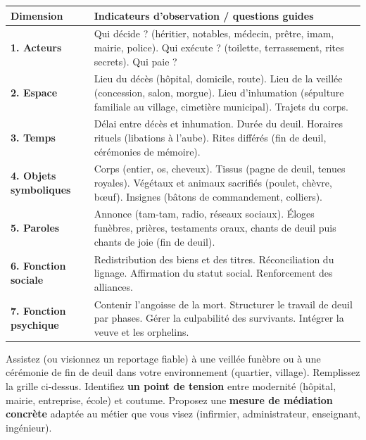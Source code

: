 \documentclass[11pt]{article}
\begin{document}
\begin{center}
\begin{tabularx}{\linewidth}{|l|X|}\hline
\rowcolor{popblueL}\textbf{Dimension} & \textbf{Indicateurs d'observation / questions guides} \\ \hline
\textbf{1. Acteurs} & Qui décide ? (héritier, notables, médecin, prêtre, imam, mairie, police). Qui exécute ? (toilette, terrassement, rites secrets). Qui paie ? \\ \hline
\textbf{2. Espace} & Lieu du décès (hôpital, domicile, route). Lieu de la veillée (concession, salon, morgue). Lieu d'inhumation (sépulture familiale au village, cimetière municipal). Trajets du corps. \\ \hline
\textbf{3. Temps} & Délai entre décès et inhumation. Durée du deuil. Horaires rituels (libations à l'aube). Rites différés (fin de deuil, cérémonies de mémoire). \\ \hline
\textbf{4. Objets symboliques} & Corps (entier, os, cheveux). Tissus (pagne de deuil, tenues royales). Végétaux et animaux sacrifiés (poulet, chèvre, bœuf). Insignes (bâtons de commandement, colliers). \\ \hline
\textbf{5. Paroles} & Annonce (tam-tam, radio, réseaux sociaux). Éloges funèbres, prières, testaments oraux, chants de deuil puis chants de joie (fin de deuil). \\ \hline
\textbf{6. Fonction sociale} & Redistribution des biens et des titres. Réconciliation du lignage. Affirmation du statut social. Renforcement des alliances. \\ \hline
\textbf{7. Fonction psychique} & Contenir l'angoisse de la mort. Structurer le travail de deuil par phases. Gérer la culpabilité des survivants. Intégrer la veuve et les orphelins. \\ \hline
\end{tabularx}
\end{center}

\begin{exercice}
Assistez (ou visionnez un reportage fiable) à une veillée funèbre ou à une cérémonie de fin de deuil dans votre environnement (quartier, village). Remplissez la grille ci-dessus. Identifiez \textbf{un point de tension} entre modernité (hôpital, mairie, entreprise, école) et coutume. Proposez une \textbf{mesure de médiation concrète} adaptée au métier que vous visez (infirmier, administrateur, enseignant, ingénieur).
\end{exercice}
\end{document}
